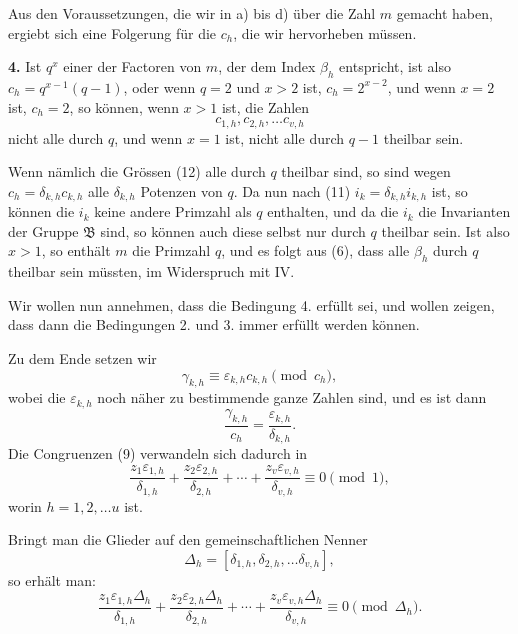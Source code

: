 \documentclass[12pt,a4paper]{article}
\theoremstyle{plain}
\theoremstyle{definition}
\theoremstyle{remark}
\begin{document}
Aus den Voraussetzungen, die wir in a) bis d) über die Zahl $m$ gemacht haben, ergiebt sich eine Folgerung für die $c_h$, die wir hervorheben müssen.

\medskip\noindent\textbf{4.} Ist $q^x$ einer der Factoren von $m$, der dem Index $\beta_h$ entspricht, ist also $c_h = q^{x-1}(q-1)$, oder wenn $q=2$ und $x > 2$ ist, $c_h = 2^{x-2}$, und wenn $x=2$ ist, $c_h = 2$, so können, wenn $x > 1$ ist, die Zahlen
\begin{equation}\tag{12}
c_{1,h}, c_{2,h}, \ldots c_{v,h}
\end{equation}
nicht alle durch $q$, und wenn $x=1$ ist, nicht alle durch $q-1$ theilbar sein.

\medskip
Wenn nämlich die Grössen (12) alle durch $q$ theilbar sind, so sind wegen $c_h = \delta_{k,h} c_{k,h}$ alle $\delta_{k,h}$ Potenzen von $q$. Da nun nach (11) $i_k = \delta_{k,h} i_{k,h}$ ist, so können die $i_k$ keine andere Primzahl als $q$ enthalten, und da die $i_k$ die Invarianten der Gruppe $\mathfrak{B}$ sind, so können auch diese selbst nur durch $q$ theilbar sein. Ist also $x > 1$, so enthält $m$ die Primzahl $q$, und es folgt aus (6), dass alle $\beta_h$ durch $q$ theilbar sein müssten, im Widerspruch mit IV.



\medskip
Wir wollen nun annehmen, dass die Bedingung 4. erfüllt sei, und wollen zeigen, dass dann die Bedingungen 2. und 3. immer erfüllt werden können.

Zu dem Ende setzen wir
\begin{equation}\tag{13}
\gamma_{k,h} \equiv \varepsilon_{k,h} c_{k,h} \pmod{c_h},
\end{equation}
wobei die $\varepsilon_{k,h}$ noch näher zu bestimmende ganze Zahlen sind, und es ist dann
\[
\frac{\gamma_{k,h}}{c_h} = \frac{\varepsilon_{k,h}}{\delta_{k,h}}.
\]
Die Congruenzen (9) verwandeln sich dadurch in
\[
\frac{z_1 \varepsilon_{1,h}}{\delta_{1,h}} + \frac{z_2 \varepsilon_{2,h}}{\delta_{2,h}} + \cdots + \frac{z_v \varepsilon_{v,h}}{\delta_{v,h}} \equiv 0 \pmod{1},
\]
worin $h = 1, 2, \ldots u$ ist.

Bringt man die Glieder auf den gemeinschaftlichen Nenner
\[
\Delta_h = [\delta_{1,h}, \delta_{2,h}, \ldots \delta_{v,h}],
\]
so erhält man:
\begin{equation}\tag{14}
\frac{z_1 \varepsilon_{1,h} \Delta_h}{\delta_{1,h}} + \frac{z_2 \varepsilon_{2,h} \Delta_h}{\delta_{2,h}} + \cdots + \frac{z_v \varepsilon_{v,h} \Delta_h}{\delta_{v,h}} \equiv 0 \pmod{\Delta_h}.
\end{equation}
\end{document}
